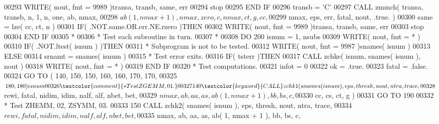 \begin{DoxyCode}
00293          \textcolor{keyword}{WRITE}( nout, fmt = 9989 )transa, transb, same, err
00294          stop
00295 \textcolor{keywordflow}{      END IF}
00296       transb = \textcolor{stringliteral}{'C'}
00297       \textcolor{keyword}{CALL }zmmch( transa, transb, n, 1, n, one, ab, nmax,
00298      $            ab( 1, nmax + 1 ), nmax, zero, c, nmax, ct, g, cc,
00299      $            nmax, eps, err, fatal, nout, .true. )
00300       same = lze( cc, ct, n )
00301       \textcolor{keywordflow}{IF}( .NOT.same.OR.err.NE.rzero )\textcolor{keywordflow}{THEN}
00302          \textcolor{keyword}{WRITE}( nout, fmt = 9989 )transa, transb, same, err
00303          stop
00304 \textcolor{keywordflow}{      END IF}
00305 \textcolor{comment}{*}
00306 \textcolor{comment}{*     Test each subroutine in turn.}
00307 \textcolor{comment}{*}
00308       \textcolor{keywordflow}{DO} 200 isnum = 1, nsubs
00309          \textcolor{keyword}{WRITE}( nout, fmt = * )
00310          \textcolor{keywordflow}{IF}( .NOT.ltest( isnum ) )\textcolor{keywordflow}{THEN}
00311 \textcolor{comment}{*           Subprogram is not to be tested.}
00312             \textcolor{keyword}{WRITE}( nout, fmt = 9987 )snames( isnum )
00313          \textcolor{keywordflow}{ELSE}
00314             srnamt = snames( isnum )
00315 \textcolor{comment}{*           Test error exits.}
00316             \textcolor{keywordflow}{IF}( tsterr )\textcolor{keywordflow}{THEN}
00317                \textcolor{keyword}{CALL }zchke( isnum, snames( isnum ), nout )
00318                \textcolor{keyword}{WRITE}( nout, fmt = * )
00319 \textcolor{keywordflow}{            END IF}
00320 \textcolor{comment}{*           Test computations.}
00321             infot = 0
00322             ok = .true.
00323             fatal = .false.
00324             \textcolor{keywordflow}{GO TO} ( 140, 150, 150, 160, 160, 170, 170,
00325      $              180, 180 )isnum
00326 \textcolor{comment}{*           Test ZGEMM, 01.}
00327   140       \textcolor{keyword}{CALL }zchk1( snames( isnum ), eps, thresh, nout, ntra, trace,
00328      $                  rewi, fatal, nidim, idim, nalf, alf, nbet, bet,
00329      $                  nmax, ab, aa, as, ab( 1, nmax + 1 ), bb, bs, c,
00330      $                  cc, cs, ct, g )
00331             \textcolor{keywordflow}{GO TO} 190
00332 \textcolor{comment}{*           Test ZHEMM, 02, ZSYMM, 03.}
00333   150       \textcolor{keyword}{CALL }zchk2( snames( isnum ), eps, thresh, nout, ntra, trace,
00334      $                  rewi, fatal, nidim, idim, nalf, alf, nbet, bet,
00335      $                  nmax, ab, aa, as, ab( 1, nmax + 1 ), bb, bs, c,

\end{DoxyCode}
